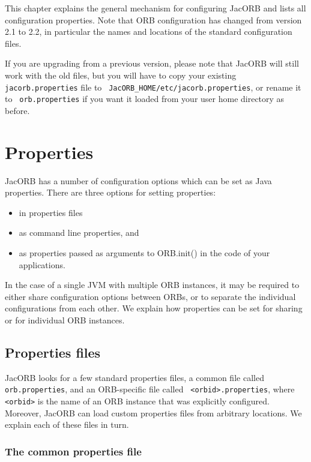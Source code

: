 %
%

This chapter explains the general mechanism for configuring JacORB
and lists all configuration properties. Note that ORB configuration
has changed from version 2.1 to 2.2, in particular the names and
locations of the standard configuration files.

If you are upgrading from a previous version, please note that JacORB
will still work with the old files, but you will have to copy your
existing {\tt jacorb.properties} file to {\tt
  JacORB\_HOME/etc/jacorb.properties}, or rename it to {\tt
  orb.properties} if you want it loaded from your user home directory
as before.

\section{Properties}

JacORB has a number of configuration options which can be set as Java
properties. There are three options for setting properties:

\begin{itemize}
\item in properties files
\item as command line properties, and
\item as properties passed as arguments to ORB.init() in the code of your
  applications.
\end{itemize}

In the case of a single JVM with multiple ORB instances, it may be
required to either share configuration options between ORBs, or to
separate the individual configurations from each other. We explain how
properties can be set for sharing or for individual ORB instances.

\subsection{Properties files}

JacORB looks for a few standard properties files, a common file called
{\tt orb.properties}, and an ORB-specific file called {\tt
  <orbid>.properties}, where {\tt <orbid>} is the name of an ORB
instance that was explicitly configured. Moreover, JacORB can load
custom properties files from arbitrary locations. We explain each of
these files in turn.

\subsubsection{The common properties file}

